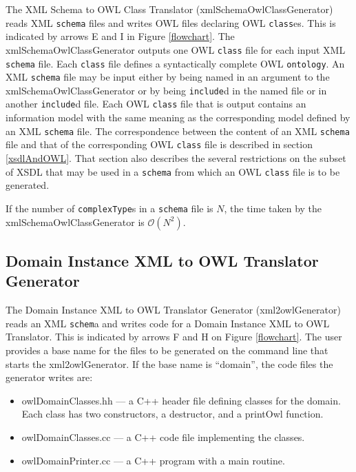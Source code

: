 \documentclass[preprint,12pt]{elsarticle}
\begin{document}
The XML Schema to OWL Class Translator (xmlSchemaOwlClassGenerator) reads
XML {\tt schema} files and writes OWL files declaring OWL {\tt class}es.
This is indicated by arrows E and I in Figure \ref{flowchart}. The
xmlSchemaOwlClassGenerator outputs one OWL {\tt class} file for each input
XML {\tt schema} file. Each {\tt class} file defines a syntactically
complete OWL {\tt ontology}. An XML {\tt schema} file may be input either
by being named in an argument to the xmlSchemaOwlClassGenerator or by being
{\tt include}d in the named file or in another {\tt include}d file. Each
OWL {\tt class} file that is output contains an information model with the
same meaning as the corresponding model defined by an XML {\tt schema}
file. The correspondence between the content of an XML {\tt schema} file
and that of the corresponding OWL {\tt class} file is described in section
\ref{xsdlAndOWL}. That section also describes the several restrictions on
the subset of XSDL that may be used in a {\tt schema} from which an OWL
{\tt class} file is to be generated.

If the number of {\tt complexType}s in a {\tt schema} file is ${N}$, the
time taken by the xmlSchemaOwlClassGenerator is $\mathcal{O}{(N^2)}$.

\subsection{Domain Instance XML to OWL Translator Generator}
\label{instanceToOWL}

The Domain Instance XML to OWL Translator Generator (xml2owlGenerator)
reads an XML {\tt schem}a and writes code for a Domain Instance XML to OWL
Translator. This is indicated by arrows F and H on Figure \ref{flowchart}.
The user provides a base name for the files to be generated on the command
line that starts the xml2owlGenerator. If the base name is ``domain'', the
code files the generator writes are:

\begin{itemize}
\item[] owlDomainClasses.hh --– a C++ header file defining classes
     for the domain. Each class has two constructors, a
     destructor,  and a printOwl function. 
\item[] owlDomainClasses.cc –-- a C++ code file implementing the
      classes.
\item[] owlDomainPrinter.cc --– a C++ program with a main routine. 
\end{itemize}
\end{document}
